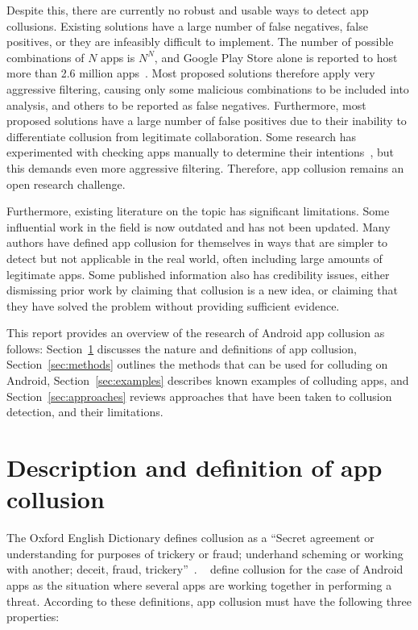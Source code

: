 \documentclass[article]{aaltoseries}
\newcommand{\Sref}[1]{Section~\ref{#1}}
\begin{document}
Despite this, there are currently no robust and usable ways to detect app collusions. Existing solutions have a large number of false negatives, false positives, or they are infeasibly difficult to implement. The number of possible combinations of $N$ apps is $N^N$, and Google Play Store alone is reported to host more than 2.6 million apps~\cite{Statista2018}. Most proposed solutions therefore apply very aggressive filtering, causing only some malicious combinations to be included into analysis, and others to be reported as false negatives. Furthermore, most proposed solutions have a large number of false positives due to their inability to differentiate collusion from legitimate collaboration. Some research has experimented with checking apps manually to determine their intentions~\cite{Muttik2016}, but this demands even more aggressive filtering. Therefore, app collusion remains an open research challenge.

Furthermore, existing literature on the topic has significant limitations. Some influential work in the field is now outdated and has not been updated. Many authors have defined app collusion for themselves in ways that are simpler to detect but not applicable in the real world, often including large amounts of legitimate apps. Some published information also has credibility issues, either dismissing prior work by claiming that collusion is a new idea, or claiming that they have solved the problem without providing sufficient evidence.

This report provides an overview of the research of Android app collusion as follows: \Sref{sec:def} discusses the nature and definitions of app collusion, \Sref{sec:methods} outlines the methods that can be used for colluding on Android, \Sref{sec:examples} describes known examples of colluding apps, and \Sref{sec:approaches} reviews approaches that have been taken to collusion detection, and their limitations.

\section{Description and definition of app collusion}
\label{sec:def}

The Oxford English Dictionary defines collusion as a ``Secret agreement or understanding for purposes of trickery or fraud; underhand scheming or working with another; deceit, fraud, trickery''~\cite{OEDcollusion}. \citeauthor{Asavoae2017}~\cite{Asavoae2017} define collusion for the case of Android apps as the situation where several apps are working together in performing a threat. According to these definitions, app collusion must have the following three properties:
\end{document}
